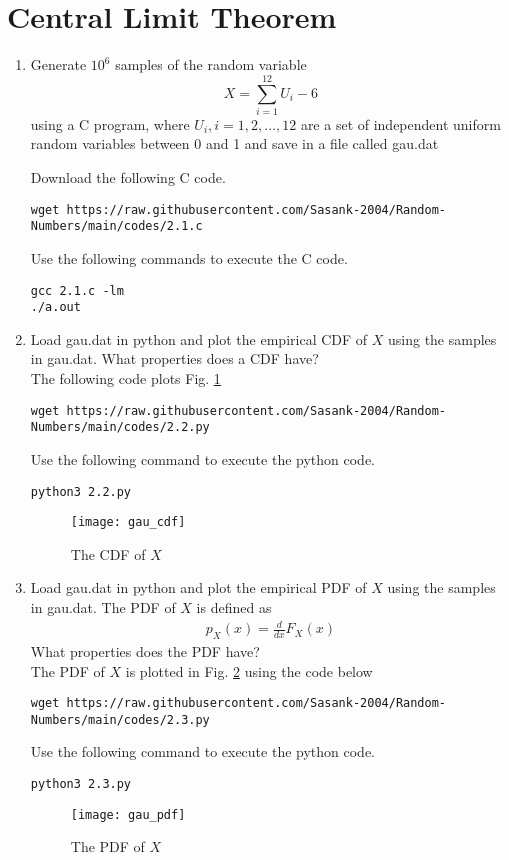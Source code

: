 \documentclass[journal,12pt,twocolumn]{IEEEtran}
\renewcommand\thesection{\arabic{section}}
\begin{document}
\section{Central Limit Theorem}
%
\begin{enumerate}[label=\thesection.\arabic*
,ref=\thesection.\theenumi]

%
\item
Generate $10^6$ samples of the random variable
%
\begin{equation}
X = \sum_{i=1}^{12}U_i -6
\end{equation}
%
using a C program, where $U_i, i = 1,2,\dots, 12$ are  a set of independent uniform random variables between 0 and 1
and save in a file called gau.dat

%
\solution  Download the following  C code.
\begin{lstlisting}
wget https://raw.githubusercontent.com/Sasank-2004/Random-Numbers/main/codes/2.1.c
\end{lstlisting}
Use the following commands to execute the C code.
\begin{lstlisting}
gcc 2.1.c -lm
./a.out 
\end{lstlisting}
\item
Load gau.dat in python and plot the empirical CDF of $X$ using the samples in gau.dat. What properties does a CDF have?
\\
\solution The following code plots Fig. \ref{fig:gau_cdf}
\begin{lstlisting}
wget https://raw.githubusercontent.com/Sasank-2004/Random-Numbers/main/codes/2.2.py
\end{lstlisting}
Use the following command to execute the python code.
\begin{lstlisting}
python3 2.2.py
\end{lstlisting}
\begin{figure}[h]
\centering
\texttt{[image: gau\_cdf]}
\caption{The CDF of $X$}
\label{fig:gau_cdf}
\end{figure}
\item
Load gau.dat in python and plot the empirical PDF of $X$ using the samples in gau.dat. The PDF of $X$ is defined as
\begin{align}
p_{X}(x) = \frac{d}{dx}F_{X}(x)
\end{align}
What properties does the PDF have?
\\
\solution The PDF of $X$ is plotted in Fig. \ref{fig:gau_pdf} using the code below
\begin{lstlisting}
wget https://raw.githubusercontent.com/Sasank-2004/Random-Numbers/main/codes/2.3.py
\end{lstlisting}
Use the following command to execute the python code.
\begin{lstlisting}
python3 2.3.py
\end{lstlisting}
\pagebreak
\begin{figure}[h]
\centering
\texttt{[image: gau\_pdf]}
\caption{The PDF of $X$}
\label{fig:gau_pdf}
\end{figure}


\end{enumerate}
\end{document}
